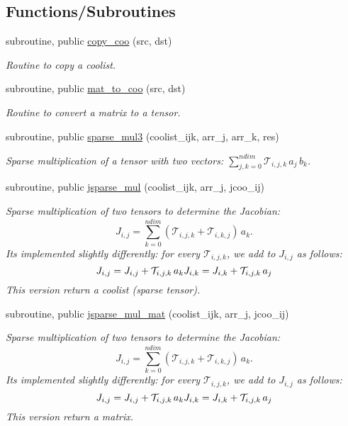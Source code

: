 \subsection*{Functions/\+Subroutines}
\begin{DoxyCompactItemize}
\item 
subroutine, public \hyperlink{namespacetensor_a14f95c256cdf137ca0767ddb3c87deea}{copy\+\_\+coo} (src, dst)
\begin{DoxyCompactList}\small\item\em Routine to copy a coolist. \end{DoxyCompactList}\item 
subroutine, public \hyperlink{namespacetensor_a75d1a9ca8b39e9ad4b151a7b4b45c70f}{mat\+\_\+to\+\_\+coo} (src, dst)
\begin{DoxyCompactList}\small\item\em Routine to convert a matrix to a tensor. \end{DoxyCompactList}\item 
subroutine, public \hyperlink{namespacetensor_a11054027a386918658f8948231af53b1}{sparse\+\_\+mul3} (coolist\+\_\+ijk, arr\+\_\+j, arr\+\_\+k, res)
\begin{DoxyCompactList}\small\item\em Sparse multiplication of a tensor with two vectors\+: ${\displaystyle \sum_{j,k=0}^{ndim}} \mathcal{T}_{i,j,k} \, a_j \,b_k$. \end{DoxyCompactList}\item 
subroutine, public \hyperlink{namespacetensor_add2a6aa993cd8a23be60d1643b5c7942}{jsparse\+\_\+mul} (coolist\+\_\+ijk, arr\+\_\+j, jcoo\+\_\+ij)
\begin{DoxyCompactList}\small\item\em Sparse multiplication of two tensors to determine the Jacobian\+: \[J_{i,j} = {\displaystyle \sum_{k=0}^{ndim}} \left( \mathcal{T}_{i,j,k} + \mathcal{T}_{i,k,j} \right) \, a_k.\] It\textquotesingle{}s implemented slightly differently\+: for every $\mathcal{T}_{i,j,k}$, we add to $J_{i,j}$ as follows\+: \[J_{i,j} = J_{i,j} + \mathcal{T}_{i,j,k} \, a_k \\ J_{i,k} = J_{i,k} + \mathcal{T}_{i,j,k} \, a_j\] This version return a coolist (sparse tensor). \end{DoxyCompactList}\item 
subroutine, public \hyperlink{namespacetensor_a4135cf70df5030070922ff199c79cc03}{jsparse\+\_\+mul\+\_\+mat} (coolist\+\_\+ijk, arr\+\_\+j, jcoo\+\_\+ij)
\begin{DoxyCompactList}\small\item\em Sparse multiplication of two tensors to determine the Jacobian\+: \[J_{i,j} = {\displaystyle \sum_{k=0}^{ndim}} \left( \mathcal{T}_{i,j,k} + \mathcal{T}_{i,k,j} \right) \, a_k.\] It\textquotesingle{}s implemented slightly differently\+: for every $\mathcal{T}_{i,j,k}$, we add to $J_{i,j}$ as follows\+: \[J_{i,j} = J_{i,j} + \mathcal{T}_{i,j,k} \, a_k \\ J_{i,k} = J_{i,k} + \mathcal{T}_{i,j,k} \, a_j\] This version return a matrix. \end{DoxyCompactList}\item 

\end{DoxyCompactItemize}
